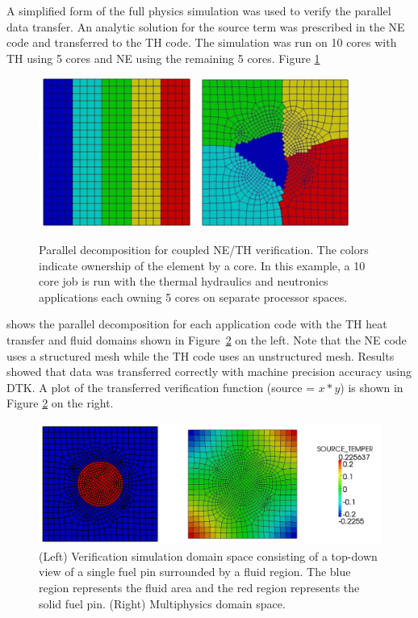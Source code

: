 \documentclass{mc2013}
\begin{document}
A simplified form of the full physics simulation was used to verify
the parallel data transfer.  An analytic solution for the source term
was prescribed in the NE code and transferred to the TH code.  The
simulation was run on 10 cores with TH using 5 cores and NE using the
remaining 5 cores.  Figure \ref{fig:parallel_decomposition}
\begin{figure}[ht!]
  \centering
  \includegraphics[width=2.0in]{neutronics_parallel_decomp.png}
  \includegraphics[width=2.0in]{cfd_parallel_decomp.png}
  \caption{Parallel decomposition for coupled NE/TH verification.  The
    colors indicate ownership of the element by a core.  In this
    example, a 10 core job is run with the thermal hydraulics and
    neutronics applications each owning 5 cores on separate processor
    spaces.}
  \label{fig:parallel_decomposition}
\end{figure}
 shows the parallel decomposition for each application code with the
 TH heat transfer and fluid domains shown in Figure~\ref{fig:domain}
 on the left.  Note that the NE code uses a structured mesh while the
 TH code uses an unstructured mesh. Results showed that data was
 transferred correctly with machine precision accuracy using DTK.  A
 plot of the transferred verification function (source = $x*y$) is
 shown in Figure \ref{fig:domain} on the right.
\begin{figure}[ht!]
  \centering \includegraphics[width=6.0in]{cht_results.png}
  \caption{(Left) Verification simulation domain space consisting of a
    top-down view of a single fuel pin surrounded by a fluid
    region. The blue region represents the fluid area and the red
    region represents the solid fuel pin. (Right) Multiphysics domain
    space.}
  \label{fig:domain}
\end{figure}
\end{document}
